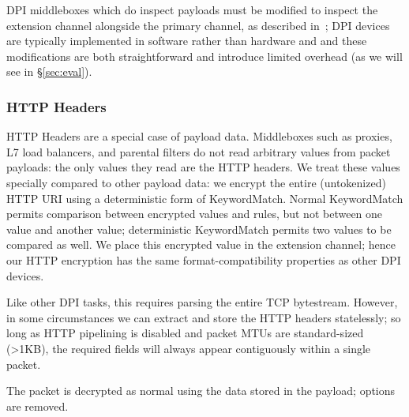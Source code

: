 DPI middleboxes which do inspect payloads must be modified to inspect the extension channel alongside the primary channel, as described in~\cite{blindbox}; DPI devices are typically implemented in software rather than hardware and and these modifications are both straightforward and introduce limited overhead (as we will see in \S\ref{sec:eval}). 

\subsubsection{HTTP Headers} 

HTTP Headers are a special case of payload data.
Middleboxes such as proxies, L7 load balancers, and parental filters do not read arbitrary values from packet payloads: the only values they read are the HTTP headers.
We treat these values specially compared to other payload data: we encrypt the entire (untokenized) HTTP URI using a deterministic form of KeywordMatch.
Normal KeywordMatch permits comparison between encrypted values and rules, but not between one value and another value; deterministic KeywordMatch permits two values to be compared as well.
We place this encrypted value in the extension channel; hence our HTTP encryption has the same format-compatibility properties as other DPI devices.

Like other DPI tasks, this requires parsing the entire TCP bytestream.
However, in some circumstances we can extract and store the HTTP headers statelessly; so long as HTTP pipelining is disabled and packet MTUs are standard-sized (>1KB), the required fields will always appear contiguously within a single packet.

 The packet is decrypted as normal using the data stored in the payload; options are removed.




